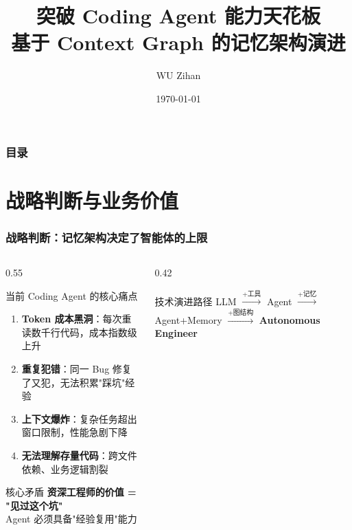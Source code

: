 \documentclass[aspectratio=169,10pt]{beamer}
\title{突破 Coding Agent 能力天花板\\{\large 基于 Context Graph 的记忆架构演进}}
\author{WU Zihan}
\date{\today}
\begin{document}
\maketitle

\begin{frame}
  \frametitle{目录}
  \tableofcontents
\end{frame}

\section{战略判断与业务价值}

\begin{frame}
  \frametitle{战略判断：记忆架构决定了智能体的上限}

  \begin{columns}[T]
    \begin{column}{0.55\textwidth}
      \begin{block}{当前 Coding Agent 的核心痛点}
        \footnotesize
        \begin{enumerate}
          \item \textbf{Token 成本黑洞}：每次重读数千行代码，成本指数级上升
          \item \textbf{重复犯错}：同一 Bug 修复了又犯，无法积累"踩坑"经验
          \item \textbf{上下文爆炸}：复杂任务超出窗口限制，性能急剧下降
          \item \textbf{无法理解存量代码}：跨文件依赖、业务逻辑割裂
        \end{enumerate}
      \end{block}

      \vspace{0.2cm}

      \begin{alertblock}{核心矛盾}
        \small
        \textbf{资深工程师的价值 = "见过这个坑"}\\
        Agent 必须具备\textcolor{dotred}{"经验复用"}能力
      \end{alertblock}
    \end{column}

    \begin{column}{0.42\textwidth}
      \begin{block}{技术演进路径}
        \small
        LLM $\xrightarrow{+工具}$ Agent $\xrightarrow{+记忆}$ Agent+Memory $\xrightarrow{+图结构}$ \textbf{Autonomous Engineer}
      \end{block}


\end{column}
\end{columns}
\end{frame}
\end{document}

